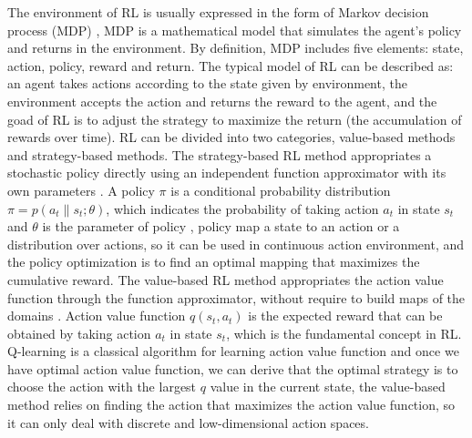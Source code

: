 \documentclass[journal]{IEEEtran}
\begin{document}
The environment of RL is usually expressed in the form of Markov decision process (MDP) \cite{van2012reinforcement},
MDP is a mathematical model that simulates the agent's policy and returns in the environment.
By definition, MDP includes five elements: state, action, policy, reward and return.
% 
The typical model of RL can be described as: an agent takes actions according to the state given by environment, the environment accepts the action and returns the reward to the agent, and the goad of RL is to adjust the strategy to maximize the return (the accumulation of rewards over time).
RL can be divided into two categories, value-based methods and strategy-based methods.
The strategy-based RL method appropriates a stochastic policy directly using an independent function approximator with its own parameters \cite{sutton1999policy}.
A policy $\pi$ is a conditional probability distribution $\pi = p(a_t\| s_t; \theta)$, which indicates the probability of taking action $a_t$ in state $s_t$ and $\theta$ is the parameter of policy \cite{sun2021learning}, policy map a state to an action or a distribution over actions, so it can be used in continuous action environment, and the policy optimization is to find an optimal mapping that maximizes the cumulative reward.
The value-based RL method appropriates the action value function through the function approximator, without require to build maps of the domains \cite{dearden1998bayesian}.
Action value function $q(s_t,a_t)$ is the expected reward that can be obtained by taking action $a_t$ in state $s_t$, which is the fundamental concept in RL. Q-learning \cite{watkins1992q} is a classical algorithm for learning action value function and once we have optimal action value function, we can derive that the optimal strategy is to choose the action with the largest $q$ value in the current state,
the value-based method relies on finding the action that maximizes the action value function, so it can only deal with discrete and low-dimensional action spaces.
\end{document}
